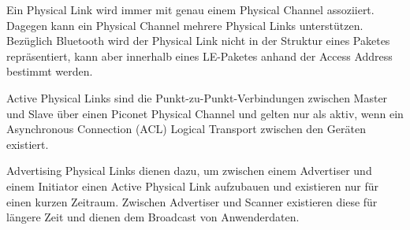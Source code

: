 Ein Physical Link wird immer mit genau einem Physical Channel assoziiert. Dagegen kann ein Physical Channel mehrere Physical Links unterstützen. Bezüglich Bluetooth wird der Physical Link nicht in der Struktur eines Paketes repräsentiert, kann aber innerhalb eines LE-Paketes anhand der Access Address bestimmt werden.

Active Physical Links sind die Punkt-zu-Punkt-Verbindungen zwischen Master und Slave über einen Piconet Physical Channel und gelten nur als aktiv, wenn ein Asynchronous Connection (ACL) Logical Transport zwischen den Geräten existiert.

Advertising Physical Links dienen dazu, um zwischen einem Advertiser und einem Initiator einen Active Physical Link aufzubauen und existieren nur für einen kurzen Zeitraum. Zwischen Advertiser und Scanner existieren diese für längere Zeit und dienen dem Broadcast von Anwenderdaten.